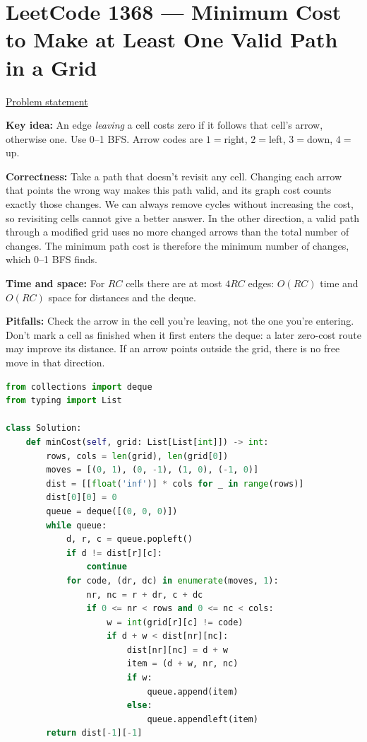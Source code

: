 \documentclass[11pt]{article}
\newcommand{\insight}[1]{\par\medskip\noindent\textbf{Key idea:} #1}
\newcommand{\correct}[1]{\par\textbf{Correctness:} #1}
\newcommand{\bounds}[1]{\par\textbf{Time and space:} #1}
\newcommand{\pitfalls}[1]{\par\textbf{Pitfalls:} #1}
\begin{document}
\section{LeetCode 1368 --- Minimum Cost to Make at Least One Valid Path in a Grid}
\href{https://leetcode.com/problems/minimum-cost-to-make-at-least-one-valid-path-in-a-grid/}{Problem statement}
\insight{An edge \emph{leaving} a cell costs zero if it follows that cell's arrow, otherwise one. Use 0--1 BFS. Arrow codes are $1=$right, $2=$left, $3=$down, $4=$up.}
\correct{Take a path that doesn't revisit any cell. Changing each arrow that points the wrong way makes this path valid, and its graph cost counts exactly those changes. We can always remove cycles without increasing the cost, so revisiting cells cannot give a better answer. In the other direction, a valid path through a modified grid uses no more changed arrows than the total number of changes. The minimum path cost is therefore the minimum number of changes, which 0--1 BFS finds.}
\bounds{For $R C$ cells there are at most $4RC$ edges: $O(RC)$ time and $O(RC)$ space for distances and the deque.}
\pitfalls{Check the arrow in the cell you're leaving, not the one you're entering. Don't mark a cell as finished when it first enters the deque: a later zero-cost route may improve its distance. If an arrow points outside the grid, there is no free move in that direction.}
\begin{lstlisting}[language=Python,caption={P03 --- Python 3},label={lst:p03-python}]
from collections import deque
from typing import List

class Solution:
    def minCost(self, grid: List[List[int]]) -> int:
        rows, cols = len(grid), len(grid[0])
        moves = [(0, 1), (0, -1), (1, 0), (-1, 0)]
        dist = [[float('inf')] * cols for _ in range(rows)]
        dist[0][0] = 0
        queue = deque([(0, 0, 0)])
        while queue:
            d, r, c = queue.popleft()
            if d != dist[r][c]:
                continue
            for code, (dr, dc) in enumerate(moves, 1):
                nr, nc = r + dr, c + dc
                if 0 <= nr < rows and 0 <= nc < cols:
                    w = int(grid[r][c] != code)
                    if d + w < dist[nr][nc]:
                        dist[nr][nc] = d + w
                        item = (d + w, nr, nc)
                        if w:
                            queue.append(item)
                        else:
                            queue.appendleft(item)
        return dist[-1][-1]
\end{lstlisting}
\end{document}
